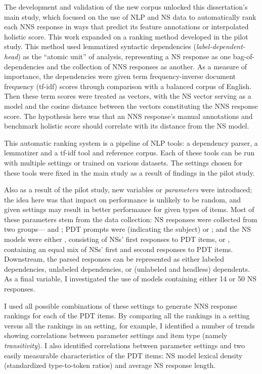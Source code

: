 The development and validation of the new corpus unlocked this dissertation's main study, which focused on the use of NLP and NS data to automatically rank each NNS response in ways that predict its feature annotations or interpolated holistic score. This work expanded on a ranking method developed in the pilot study. This method used lemmatized syntactic dependencies (\textit{label-dependent-head}) as the ``atomic unit'' of analysis, representing a NS response as one bag-of-dependencies and the collection of NNS responses as another. As a measure of importance, the dependencies were given term frequency-inverse document frequency (tf-idf) scores through comparison with a balanced corpus of English. Then these term scores were treated as vectors, with the NS vector serving as a model and the cosine distance between the vectors constituting the NNS response score. The hypothesis here was that an NNS response's manual annotations and benchmark holistic score should correlate with its distance from the NS model.

This automatic ranking system is a pipeline of NLP tools: a dependency parser, a lemmatizer and a tf-idf tool and reference corpus. Each of these tools can be run with multiple settings or trained on various datasets.
The settings chosen for these tools were fixed in the main study as a result of findings in the pilot study.

Also as a result of the pilot study, new variables or \textit{parameters} were introduced; the idea here was that impact on performance is unlikely to be random, and given settings may result in better performance for given types of items. Most of these parameters stem from the data collection: NS responses were collected from two groups--- and ; PDT prompts were  (indicating the subject) or ; and the NS models were either , consisting of NSs' first responses to PDT items, or , containing an equal mix of NSs' first and second responses to PDT items. Downstream, the parsed responses can be represented as either labeled dependencies, unlabeled dependencies, or (unlabeled and headless) dependents. As a final variable, I investigated the use of models containing either 14 or 50 NS responses.

I used all possible combinations of these settings to generate NNS response rankings for each of the PDT items. By comparing all the rankings in a  setting versus all the rankings in an  setting, for example, I identified a number of trends showing correlations between parameter settings and item type (namely \textit{transitivity}). I also identified correlations between parameter settings and two easily measurable characteristics of the PDT items: NS model lexical density (standardized type-to-token ratios) and average NS response length.

